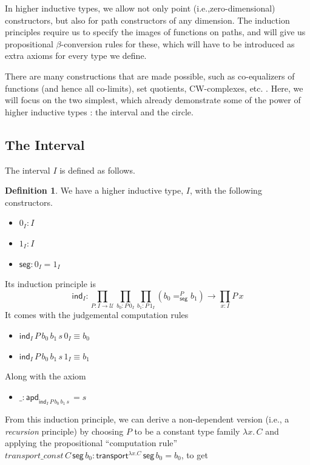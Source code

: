 \documentclass[12 pt]{amsart}
\theoremstyle{definition}
\newtheorem{definition}[subsubsection]{Definition}
\theoremstyle{remark}
\newcommand{\Type}{\mathcal{U}}
\newcommand{\trans}{\mathsf{transport}}
\newcommand{\apd}{\mathsf{apd}}
\newcommand{\seg}{{\mathsf{ seg}}}
\begin{document}

In higher inductive types, we allow not only point (i.e.,zero-dimensional) constructors, but also for path constructors of any dimension. The induction principles require us to specify the images of functions on paths, and will give us propositional $\beta$-conversion rules for these, which will have to be introduced as extra axioms for every type we define.

There are many constructions that are made possible, such as co-equalizers of functions (and hence all co-limits), set quotients, CW-complexes, etc. \cite[Chapter 6]{hottbook}. Here, we will focus on the two simplest, which already demonstrate some of the power of higher inductive types : the interval and the circle.


\subsection{The Interval}

The interval $I$ is defined as follows.

\begin{definition}
We have a higher inductive type, $I$, with the following constructors.
\begin{itemize}
\item $0_I : I$
\item $1_I : I$
\item $\seg : 0_I = 1_I$
\end{itemize}
Its induction principle is 
\[\mathsf{ind}_I : \prod_{P : I \to \Type} \prod_{b_0 : P\,0_I} \prod_{b_1 : P\, 1_I} (b_0 =^P_{\seg} b_1) \to \prod_{x : I} P\,x\]
It comes with the judgemental computation rules
\begin{itemize}
\item $\mathsf{ind}_I\, P \, b_0 \, b_1 \, s \, 0_I\equiv b_0$
\item $\mathsf{ind}_I\, P \, b_0 \, b_1 \, s \, 1_I\equiv b_1$
\end{itemize}
Along with the axiom
\begin{itemize}
\item $\_ :\apd_{\mathsf{ind}_I\, P \, b_0 \, b_1 \, s} \, = s $
\end{itemize}
\end{definition}

From this induction principle, we can derive a non-dependent version (i.e., a \textit{recursion} principle) by choosing $P$ to be a constant type family $\lambda x. \, C$ and applying the propositional ``computation rule''  $transport\_const\,C \, \seg\, b_0 :  \trans^{\lambda x. C}\, \seg \,b_0 = b_0$, to get 
\end{document}
